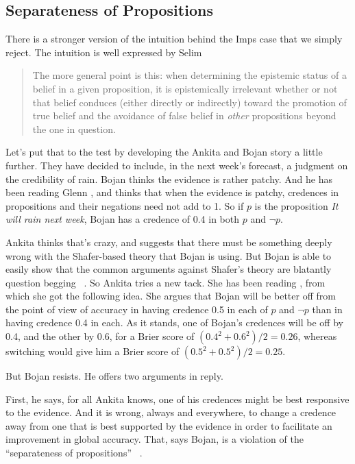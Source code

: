 \subsection{Separateness of Propositions}
\label{separatenessofpropositions}

There is a stronger version of the intuition behind the Imps case that we simply reject. The intuition is well expressed by Selim  \citet[365, emphasis in original]{Berker2013b}

\begin{quote}

The more general point is this: when determining the epistemic status of a belief in a given proposition, it is epistemically irrelevant whether or not that belief conduces (either directly or indirectly) toward the promotion of true belief and the avoidance of false belief in \emph{other} propositions beyond the one in question.
\end{quote}
Let's put that to the test by developing the Ankita and Bojan story a little further. They have decided to include, in the next week's forecast, a judgment on the credibility of rain. Bojan thinks the evidence is rather patchy. And he has been reading Glenn  \citet{Shafer1976}, and thinks that when the evidence is patchy, credences in propositions and their negations need not add to 1. So if $p$ is the proposition \emph{It will rain next week}, Bojan has a credence of 0.4 in both $p$ and $\neg p$.

Ankita thinks that's crazy, and suggests that there must be something deeply wrong with the Shafer-based theory that Bojan is using. But Bojan is able to easily show that the common arguments against Shafer's theory are blatantly question begging ~\citep{Maher1997, Weatherson1999}. So Ankita tries a new tack. She has been reading  \citet{Joyce1998}, from which she got the following idea. She argues that Bojan will be better off from the point of view of accuracy in having credence 0.5 in each of $p$ and $\neg p$ than in having credence 0.4 in each. As it stands, one of Bojan's credences will be off by 0.4, and the other by 0.6, for a Brier score of $(0.4^2 + 0.6^2)/2 = 0.26$, whereas switching would give him a Brier score of $(0.5^2 + 0.5^2)/2 = 0.25$.

But Bojan resists. He offers two arguments in reply.

First, he says, for all Ankita knows, one of his credences might be best responsive to the evidence. And it is wrong, always and everywhere, to change a credence away from one that is best supported by the evidence in order to facilitate an improvement in global accuracy. That, says Bojan, is a violation of the ``separateness of propositions'' ~\citep{Berker2013b}.

